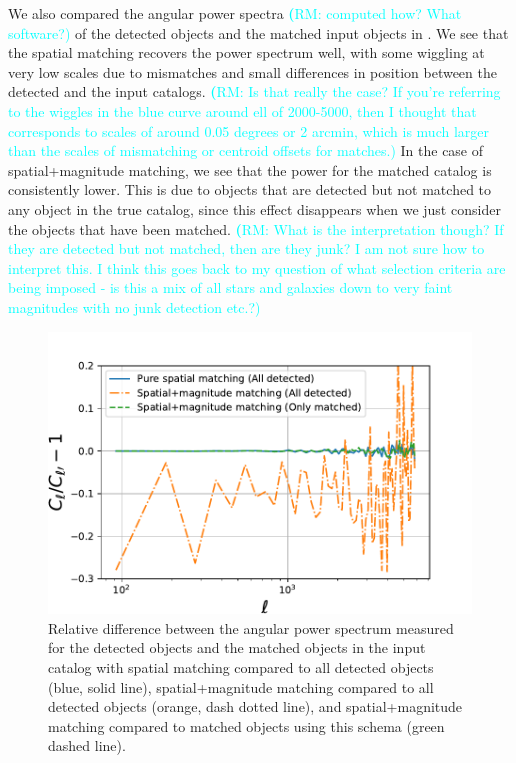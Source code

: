 \documentclass[twocolumn]{aastex62}
\newcommand{\rachel}[1]{{\textcolor{cyan}{{\textbf (RM: #1)}}}}
\begin{document}
We also compared the angular power spectra \rachel{computed how?  What software?} of the detected objects and the matched input objects in . We see that the spatial matching recovers the power spectrum well, with some wiggling at very low scales due to mismatches and small differences in position between the detected and the input catalogs. \rachel{Is that really the case?  If you're referring to the wiggles in the blue curve around ell of 2000-5000, then I thought that corresponds to scales of around 0.05 degrees or 2 arcmin, which is much larger than the scales of mismatching or centroid offsets for matches.} In the case of spatial+magnitude matching, we see that the power for the matched catalog is consistently lower. This is due to objects that are detected but not matched to any object in the true catalog, since this effect disappears when we just consider the objects that have been matched. \rachel{What is the interpretation though?  If they are detected but not matched, then are they junk?  I am not sure how to interpret this.  I think this goes back to my question of what selection criteria are being imposed - is this a mix of all stars and galaxies down to very faint magnitudes with no junk detection etc.?}

\begin{figure}
\centering
\includegraphics[width=0.9\columnwidth]{cl_comparison_matching.pdf}
\caption{Relative difference between the angular power spectrum measured for the detected objects and the matched objects in the input catalog with spatial matching compared to all detected objects (blue, solid line), spatial+magnitude matching compared to all detected objects (orange, dash dotted line), and spatial+magnitude matching compared to matched objects using this schema (green dashed line).}
\label{fig:matching_cls}
\end{figure}
\end{document}
